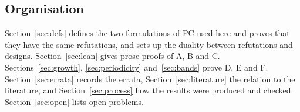 \subsection{Organisation}

Section~\ref{sec:defs} defines the two formulations of PC used here and proves that
they have the same refutations, and sets up the duality between refutations and designs.
Section~\ref{sec:lean} gives prose proofs of A, B and C.  Sections~\ref{sec:growth},
\ref{sec:periodicity} and~\ref{sec:bands} prove D, E and F.  Section~\ref{sec:errata}
records the errata, Section~\ref{sec:literature} the relation to the literature, and
Section~\ref{sec:process} how the results were produced and checked.
Section~\ref{sec:open} lists open problems.
